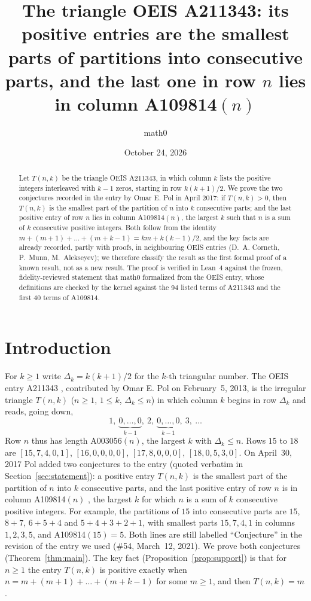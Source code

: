 \documentclass[11pt]{amsart}
\title[Smallest parts of partitions into consecutive parts (OEIS A211343)]{The triangle OEIS A211343: its positive entries are the smallest parts of partitions into consecutive parts, and the last one in row $n$ lies in column A109814$(n)$}
\author{math0}
\date{October 24, 2026}
\theoremstyle{plain}
\theoremstyle{definition}
\begin{document}
\begin{abstract}
Let $T(n,k)$ be the triangle OEIS A211343, in which column $k$ lists the positive integers interleaved with $k-1$ zeros, starting in row $k(k+1)/2$.
We prove the two conjectures recorded in the entry by Omar E. Pol in April 2017: if $T(n,k)>0$, then $T(n,k)$ is the smallest part of the partition of $n$ into $k$ consecutive parts; and the last positive entry of row $n$ lies in column A109814$(n)$, the largest $k$ such that $n$ is a sum of $k$ consecutive positive integers.
Both follow from the identity $m+(m+1)+\dots+(m+k-1)=km+k(k-1)/2$, and the key facts are already recorded, partly with proofs, in neighbouring OEIS entries (D.~A. Corneth, P.~Munn, M.~Alekseyev); we therefore classify the result as the first formal proof of a known result, not as a new result.
The proof is verified in Lean~4 against the frozen, fidelity-reviewed statement that math0 formalized from the OEIS entry, whose definitions are checked by the kernel against the $94$ listed terms of A211343 and the first $40$ terms of A109814.
\end{abstract}
\maketitle

\section{Introduction}

For $k\ge1$ write $\Delta_k=k(k+1)/2$ for the $k$-th triangular number. The OEIS entry A211343 \cite{A211343}, contributed by Omar E. Pol on February~5, 2013, is the irregular triangle $T(n,k)$ ($n\ge1$, $1\le k$, $\Delta_k\le n$) in which column $k$ begins in row $\Delta_k$ and reads, going down,
\[
  1,\ \underbrace{0,\dots,0}_{k-1},\ 2,\ \underbrace{0,\dots,0}_{k-1},\ 3,\ \dots
\]
Row $n$ thus has length A003056$(n)$, the largest $k$ with $\Delta_k\le n$. Rows $15$ to $18$ are $[15,7,4,0,1]$, $[16,0,0,0,0]$, $[17,8,0,0,0]$, $[18,0,5,3,0]$.
On April~30, 2017 Pol added two conjectures to the entry (quoted verbatim in Section~\ref{sec:statement}): a positive entry $T(n,k)$ is the smallest part of the partition of $n$ into $k$ consecutive parts, and the last positive entry of row $n$ is in column A109814$(n)$ \cite{A109814}, the largest $k$ for which $n$ is a sum of $k$ consecutive positive integers. For example, the partitions of $15$ into consecutive parts are $15$, $8+7$, $6+5+4$ and $5+4+3+2+1$, with smallest parts $15,7,4,1$ in columns $1,2,3,5$, and A109814$(15)=5$. Both lines are still labelled ``Conjecture'' in the revision of the entry we used (\#54, March~12, 2021). We prove both conjectures (Theorem~\ref{thm:main}). The key fact (Proposition~\ref{prop:support}) is that for $n\ge1$ the entry $T(n,k)$ is positive exactly when $n=m+(m+1)+\dots+(m+k-1)$ for some $m\ge1$, and then $T(n,k)=m$.
\end{document}
